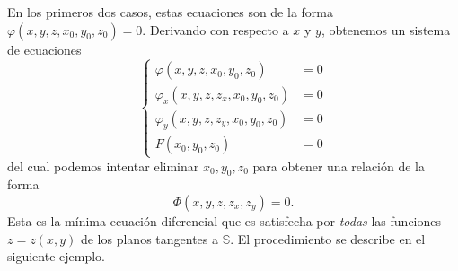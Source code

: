 \documentclass[11pt,letterpaper,draft]{report}
\theoremstyle{plain}
\theoremstyle{definition}
\theoremstyle{remark}
\newcommand\<{\langle}
\renewcommand\>{\rangle}
\renewcommand\phi\varphi
\begin{document}
En los primeros dos casos, estas ecuaciones son de la forma
\(\phi(x,y,z,x_0,y_0,z_0)=0\).
Derivando con respecto a \(x\) y \(y\), obtenemos un sistema de
ecuaciones
\begin{equation}
  \left\{
    \begin{aligned}
      \phi(x,y,z,x_0,y_0,z_0) &= 0 \\
      \phi_x(x,y,z,z_x,x_0,y_0,z_0) &= 0 \\
      \phi_y(x,y,z,z_y,x_0,y_0,z_0) &= 0 \\
      F(x_0,y_0,z_0) &= 0
    \end{aligned}
    \right.
\end{equation}
del cual podemos intentar eliminar \(x_0,y_0,z_0\) para obtener una
relación de la forma
\begin{equation}
  \Phi(x,y,z,z_x,z_y) = 0
.\end{equation}
Esta es la mínima ecuación diferencial que es satisfecha por \emph{todas}
las funciones \(z=z(x,y)\) de los planos tangentes a \(\mathbb S\).
%
El procedimiento se describe en el siguiente ejemplo.
\end{document}
